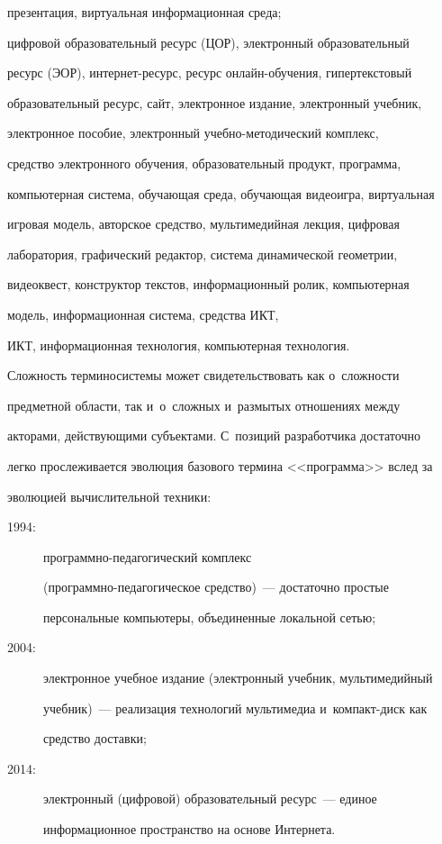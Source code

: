 \begin{description}
презентация, виртуальная информационная среда;\\[-14pt]



\item[2014:] цифровой образовательный ресурс (ЦОР), электронный образовательный

ресурс (ЭОР), интернет-ресурс, ресурс он\-лайн-обуче\-ния, гипертекстовый

образовательный ресурс, сайт, электронное издание, электронный учебник,

электронное пособие, электронный учеб\-но-ме\-то\-ди\-че\-ский комплекс,

средство электронного обучения, образовательный продукт, программа,

компьютерная система, обуча\-ющая среда, обучающая видеоигра, виртуальная

игровая модель, авторское средство, мультимедийная лекция, цифровая

лаборатория, графический редактор, система динамической геометрии,

видеоквест, конструктор текстов, информационный ролик, компьютерная

модель, информационная система, средства ИКТ,

   ИКТ, информационная технология,  компьютерная технология.

\end{description}



  Сложность терминосистемы может свидетельствовать как о~сложности

предметной области, так и~о~сложных и~размытых отношениях между

акторами, действующими субъектами. С~позиций разработчика достаточно

легко прослеживается эволюция базового термина <<программа>> вслед за

эволюцией вычислительной техники:

\begin{description}

\item[1994:] программно-педагогический комплекс

  (про\-грам\-мно-пе\-да\-го\-ги\-че\-ское средство)~--- достаточно простые

персональные компьютеры, объединенные локальной сетью;



\item[2004:] электронное учебное издание (электронный учебник, мультимедийный

учебник)~--- реализация технологий мультимедиа и~ком\-пакт-диск как

средство доставки;



\item[2014:] электронный (цифровой) образовательный ресурс~--- единое

информационное пространство на основе Интернета.

\end{description}




